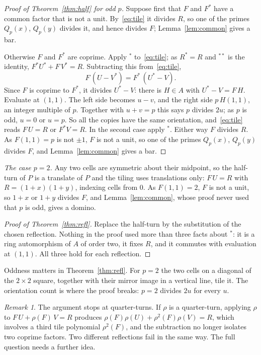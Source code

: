 \documentclass[11pt]{article}
\theoremstyle{remark}
\newtheorem*{remark}{Remark}
\begin{document}
\begin{proof}[Proof of Theorem~\ref{thm:half} for odd $p$]
Suppose first that $F$ and $F^*$ have a common factor that is not a unit. By~\eqref{eq:tile} it divides $R$, so
one of the primes $Q_p(x)$, $Q_p(y)$ divides it, and hence divides $F$; Lemma~\ref{lem:common} gives a bar.

Otherwise $F$ and $F^*$ are coprime. Apply ${}^*$ to~\eqref{eq:tile}; as $R^*=R$ and ${}^{**}$ is the identity,
$F^*U^*+F\,V^*=R$. Subtracting this from~\eqref{eq:tile},
\[
F\,(U-V^*)=F^*\,(U^*-V).
\]
Since $F$ is coprime to $F^*$, it divides $U^*-V$: there is $H\in A$ with $U^*-V=F\,H$. Evaluate at $(1,1)$.
The left side becomes $u-v$, and the right side $p\,H(1,1)$, an integer multiple of $p$. Together with
$u+v=p$ this says $p$ divides $2u$; as $p$ is odd, $u=0$ or $u=p$. So all the copies have the same
orientation, and~\eqref{eq:tile} reads $F\,U=R$ or $F^*V=R$. In the second case apply ${}^*$. Either way $F$
divides $R$. As $F(1,1)=p$ is not $\pm1$, $F$ is not a unit, so one of the primes $Q_p(x)$, $Q_p(y)$ divides $F$, and Lemma~\ref{lem:common} gives a bar.
\end{proof}

\emph{The case $p=2$.} Any two cells are symmetric about their midpoint, so the half-turn of $P$ is a translate
of $P$ and the tiling uses translations only: $F\,U=R$ with $R=(1+x)(1+y)$, indexing cells from $0$. As
$F(1,1)=2$, $F$ is not a unit, so $1+x$ or $1+y$ divides $F$, and Lemma~\ref{lem:common}, whose proof never
used that $p$ is odd, gives a domino.

\begin{proof}[Proof of Theorem~\ref{thm:refl}]
Replace the half-turn by the substitution of the chosen reflection. Nothing in the proof used more than three
facts about ${}^*$: it is a ring automorphism of $A$ of order two, it fixes $R$, and it commutes with
evaluation at $(1,1)$. All three hold for each reflection.
\end{proof}

Oddness matters in Theorem~\ref{thm:refl}. For $p=2$ the two cells on a diagonal of the $2\times2$ square,
together with their mirror image in a vertical line, tile it. The orientation count is where the proof breaks:
$p=2$ divides $2u$ for every $u$.

\begin{remark}
The argument stops at quarter-turns. If $\rho$ is a quarter-turn, applying $\rho$ to $F\,U+\rho(F)\,V=R$
produces $\rho(F)\rho(U)+\rho^2(F)\rho(V)=R$, which involves a third tile polynomial $\rho^2(F)$, and the
subtraction no longer isolates two coprime factors. Two different reflections fail in the same way. The full
question needs a further idea.
\end{remark}
\end{document}
